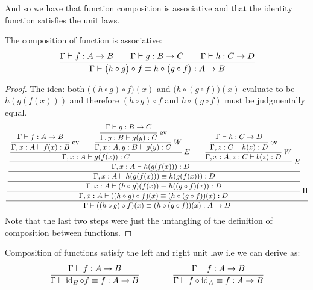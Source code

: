 And so we have that function composition is associative and that the identity function satisfies the unit laws.

\begin{lemma}
    The composition of function is associative:
    \begin{equation*}
        \cfrac{\Gamma\vdash f:A\rightarrow B \qquad \Gamma\vdash g:B\rightarrow C\qquad \Gamma\vdash h:C\rightarrow D}{\Gamma\vdash \big(h\circ g\big)\circ f\equiv h\circ\big(g\circ f\big):A\rightarrow B}
    \end{equation*}
\end{lemma}


\begin{proof}
    The idea: both $\big((h\circ g)\circ f\big)(x)$ and $\big( h\circ(g\circ f) \big)(x)$ evaluate to be $h(g(f(x)))$ and therefore $(h\circ g)\circ f$ and $h\circ(g\circ f)$ must be judgmentally equal.
    \begin{equation*}
        \cfrac{\cfrac{\cfrac{\cfrac{\cfrac{\cfrac{\cfrac{\Gamma\vdash f:A\to B}{\Gamma, x:A\vdash f(x):B}\text{ ev}\qquad\cfrac{\cfrac{\Gamma\vdash g:B\to C}{\Gamma, y:B\vdash g(y):C}\text{ ev}}{\Gamma, x:A, y:B\vdash g(y):C}\ W}{\Gamma, x:A\vdash g(f(x)):C}\ E\qquad \cfrac{\cfrac{\Gamma\vdash h:C\to D}{\Gamma, z:C\vdash h(z):D}\text{ ev}}{\Gamma, x:A, z:C\vdash b(z):D}\ W}{\Gamma,x:A\vdash h(g(f(x))):D} \ E}{\Gamma,x:A\vdash h(g(f(x)))\equiv h(g(f(x))):D}}{\Gamma,x:A\vdash (h\circ g)(f(x))\equiv h((g\circ f)(x)):D}}{\Gamma,x:A\vdash ((h\circ g)\circ f)(x)\equiv (h\circ(g\circ f))(x):D}\ \Pi}{\Gamma\vdash ((h\circ g)\circ f)(x)\equiv (h\circ(g\circ f))(x):A\to D}
    \end{equation*}
    Note that the last two steps were just the untangling of the definition of composition between functions.
\end{proof}


\begin{lemma}
    Composition of functions satisfy the left and right unit law i.e we can derive as:
    \begin{equation*}
        \cfrac{\Gamma\vdash f:A\rightarrow B}{\Gamma\vdash\operatorname{id}_B\circ f\equiv f:A\rightarrow B} \qquad\qquad \cfrac{\Gamma\vdash f:A\rightarrow B}{\Gamma\vdash f\circ \operatorname{id}_A\equiv f:A\rightarrow B}
    \end{equation*}
\end{lemma}

